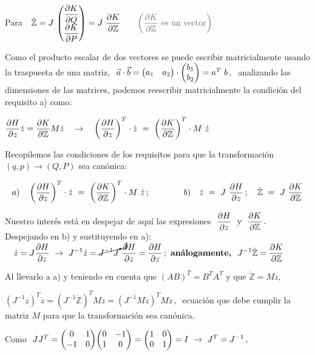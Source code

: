  Para $\ \  \dot{\mathbb Z}=J\ \mqty(\displaystyle \pdv{K}{Q} \\ \displaystyle \pdv{K}{P} )= J \ \displaystyle \pdv{K}{\mathbb Z} \qquad \textcolor{gris}{\left( \pdv{K}{\mathbb Z} \text{ es un vector} \right)}$
 
 Como el producto escalar de dos vectores se puede escribir matricialmente usando la traspuesta de una matriz, $\ \vec a \cdot \vec b=\mqty(a_1&a_2) \cdot \mqty(b_1\\b_2)=a^T \ b\, , \ $ analizando las dimensiones de las matrices, podemos reescribir matricialmente la condición del requisito a) como:
 
 
$\displaystyle \pdv{H}{z} \dot z = \pdv{K}{\mathbb Z} M \dot z \quad \to \quad \left( \pdv{H}{z} \right)^T \cdot \dot z \ = \ \left( \pdv{K}{\mathbb Z} \right)^T \cdot  M \ \dot{z}$

\vspace{5mm} Recopilemos las condiciones de los requisitos para que la transformación $(q,p) \to (Q,P)$ sea canónica:

\vspace{5mm}
\begin{tarongeta}
$$a)\quad 	\left( \pdv{H}{z} \right)^T \cdot \dot z \ = \ \left( \pdv{K}{\mathbb Z} \right)^T \cdot  M \ \dot{z} \, ; \qquad \qquad
b) \quad \dot z \ = \ J\ \pdv{H}{z} \, ; \quad  \dot{\mathbb Z} \ = \ J\ \pdv{K}{\mathbb Z}$$
\end{tarongeta}
\vspace{5mm}

Nuestro interés está en despejar de aquí las expresiones $\ \displaystyle \pdv{H}{z} \  \text { y }  \ \pdv{K}{\mathbb Z}\, . \  $  Despejando en b) y sustituyendo en a):
$\quad \displaystyle \dot z=J \pdv{H}{z} \ \to \ J^{-1} \dot z = \cancelto{I}{J^{-1} J}\  \pdv{H}{z}=\pdv{H}{z}\, ; \ \textbf{análogamente, } \ J^{-1} \dot{\mathbb Z}=\pdv{K}{\mathbb Z}$

Al llevarlo a a) y teniendo en cuenta que $(AB)^T=B^TA^T$ y que $\dot{\mathbb Z}=M\dot z$,

$\displaystyle (J^{-1} \dot z)^T \dot z = (J^{-1} \dot{\mathbb Z} )^T M\dot z =   (J^{-1} M \dot z )^T M\dot z \, , \ $ ecuación que debe cumplir la matriz $M$ para que la transformación sea canónica.

Como $\ JJ^T=\mqty(0&1\\-1&0)\mqty(0&-1\\1&0)=\mqty(1&0\\0&1)=I \ \to \ J^T=J^{-1}\, , \ $ 


